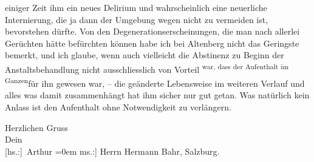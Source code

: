               einiger Zeit ihm ein neues Delirium und wahrscheinlich eine neuerliche Internierung,
               die ja dann der Umgebung wegen nicht zu vermeiden ist, bevorstehen dürfte. Von den
               Degenerationserscheinungen, die man nach allerlei Gerüchten hätte befürchten können
               habe ich bei Altenberg nicht das Geringste
               bemerkt, und ich glaube, wenn auch vielleicht die \label{T_L02129-1v}\label{T_L02129-1}
               Abstinenz zu Beginn der Anstaltsbehandlung nicht ausschliesslich von Vorteil \substVorne{}\textsuperscript{war, dass der Aufenthalt im Ganzen}\substDazwischen{}für ihn gewesen war\substHinten{}, – die geänderte Lebensweise im weiteren Verlauf und alles was damit
               zusammenhängt hat ihm sicher nur gut getan. Was natürlich kein Anlass ist den
               Aufenthalt ohne Notwendigkeit zu verlängern.\pend
           
\pstart
           Herzlichen Gruss{\\[\baselineskip]}Dein{\\[\baselineskip]}\spacefill\mbox{{[}hs.:{]} Arthur}\pend
           \leftskip=0em{}
\pstart
           \noindent{}{[}ms.:{]} Herrn Hermann Bahr, Salzburg.\pend
           \endnumbering{}  
      